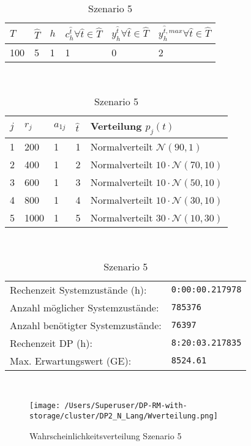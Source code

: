 \begin{table}[h!]
\renewcommand{\arraystretch}{1.5}
  \begin{center}
    \caption{Szenario 5}  \label{S5}
    \vspace*{3mm}
    \begin{tabular}{l l l l l l}   %
    $T$ & $\hat T$  & $h$ & $c_h^{\hat t}\forall \hat{t}\in{\hat T}$ & $y_h^{\hat t}\forall \hat{t}\in{\hat T}$  & $y_h^{{\hat t},max}\forall \hat{t}\in{\hat T}$  \\  \hline
100 & 5 & 1 & 1 & 0 & 2  \\ \hline
    \end{tabular} \\[3mm]
        \begin{tabular}{p{1cm} p{1cm} p{1cm}  p{1cm} p{6cm}}   %
    $j$ & $r_j$  & $a_{1j}$ & $\hat t$ & Verteilung $p_j(t)$ \\  \hline
1 & 200 & 1 & 1 & Normalverteilt $\mathcal{N}(90, 1)$   \\
2 & 400 & 1 & 2 & Normalverteilt $10\cdot\mathcal{N}(70, 10)$  \\
3 & 600 & 1 & 3 & Normalverteilt $10\cdot\mathcal{N}(50, 10)$  \\
4 & 800 & 1 & 4 & Normalverteilt $10\cdot\mathcal{N}(30, 10)$  \\
5 & 1000 & 1 & 5 & Normalverteilt $30\cdot\mathcal{N}(10, 30)$ \\
\hline
    \end{tabular} \\[3mm]
     \begin{tabular}{p{7cm}p{5cm}} \hline
     Rechenzeit Systemzustände (h): & \texttt{0:00:00.217978} \\
     Anzahl möglicher Systemzustände: & \texttt{785376} \\
     Anzahl benötigter Systemzustände: & \texttt{76397} \\ 
     Rechenzeit DP (h): & \texttt{8:20:03.217835} \\ 
          Max. Erwartungswert (GE): & \texttt{8524.61} \\ \hline
         \end{tabular} \\[3mm]
  \end{center}
\end{table}

\begin{figure}[h!]
  \begin{center}
    \texttt{[image: /Users/Superuser/DP-RM-with-storage/cluster/DP2\_N\_Lang/Wverteilung.png]}
    \caption{Wahrscheinlichkeitsverteilung Szenario 5}  \label{SB5}
  \end{center}
\end{figure}

